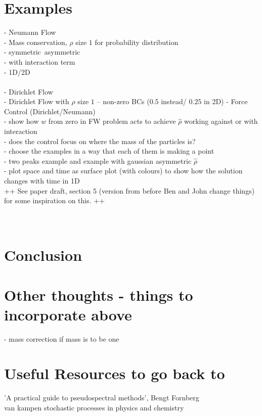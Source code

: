 \documentclass[11pt, a4paper]{article}
\theoremstyle{definition}
\begin{document}
\section{Examples}
- Neumann Flow\\
- Mass conservation, $\rho$ size $1$ for probability distribution\\
- symmetric\ asymmetric\\
- with interaction term \\
- 1D/2D \\
\\
- Dirichlet Flow \\
- Dirichlet Flow with $\rho$ size $1$ -- non-zero BCs ($0.5$ instead/ $0.25$ in 2D)
- Force Control (Dirichlet/Neumann) \\
- show how $w$ from zero in FW problem acts to achieve $\hat \rho$ working against or with interaction\\
- does the control focus on where the mass of the particles is?\\
- choose the examples in a way that each of them is making a point\\
- two peaks example and example with gaussian asymmetric $\hat \rho$\\
- plot space and time as surface plot (with colours) to show how the solution changes with time in 1D\\

++ See paper draft, section 5 (version from before Ben and John change things) for some inspiration on this. ++ \\
\\
\\


\section{Conclusion}



\pagebreak	



\pagebreak
\appendix

\section{Other thoughts - things to incorporate above}
- mass correction if mass is to be one\\


\section{Useful Resources to go back to}
'A practical guide to pseudospectral methods', Bengt Fornberg\\
van kampen stochastic processes in physics and chemistry
\end{document}
